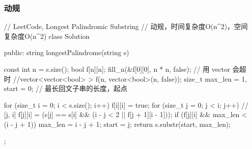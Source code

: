 \subsubsection{动规}
\begin{Code}
// LeetCode, Longest Palindromic Substring
// 动规，时间复杂度O(n^2)，空间复杂度O(n^2)
class Solution {
public:
    string longestPalindrome(string s) {
        const int n = s.size();
        bool f[n][n];
        fill_n(&f[0][0], n * n, false);
        // 用 vector 会超时
        //vector<vector<bool> > f(n, vector<bool>(n, false));
        size_t max_len = 1, start = 0;  // 最长回文子串的长度，起点

        for (size_t i = 0; i < s.size(); i++) {
            f[i][i] = true;
            for (size_t j = 0; j < i; j++) {  // [j, i]
                f[j][i] = (s[j] == s[i] && (i - j < 2 || f[j + 1][i - 1]));
                if (f[j][i] && max_len < (i - j + 1)) {
                    max_len = i - j + 1;
                    start = j;
                }
            }
        }
        return s.substr(start, max_len);
    }
};
\end{Code}


